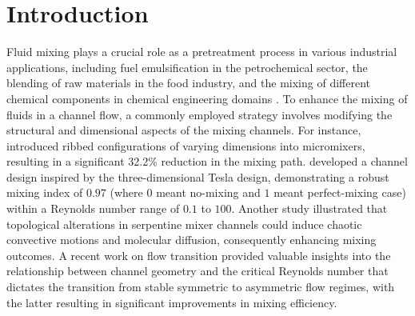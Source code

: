 \documentclass[%
aip,
amsmath,amssymb,
reprint,
]{revtex4-1}
\begin{document}
	\section{Introduction}
	\label{sec:headings}
	Fluid mixing plays a crucial role as a pretreatment process in various industrial applications, including fuel emulsification in the petrochemical sector, the blending of raw materials in the food industry, and the mixing of different chemical components in chemical engineering domains \citep{Peterwitz2021,Wang2021, Nunez-Flores2020, Yeh2015}. To enhance the mixing of fluids in a channel flow, a commonly employed strategy involves modifying the structural and dimensional aspects of the mixing channels. For instance, \cite{Kim2011} introduced ribbed configurations of varying dimensions into micromixers, resulting in a significant 32.2\% reduction in the mixing path. \cite{Yang2015} developed a channel design inspired by the three-dimensional Tesla design, demonstrating a robust mixing index of $0.97$ (where $0$ meant no-mixing and $1$ meant perfect-mixing case) within a Reynolds number range of $0.1$ to $100$. Another study\cite{Chen2016} illustrated that topological alterations in serpentine mixer channels could induce chaotic convective motions and molecular diffusion, consequently enhancing mixing outcomes. A recent work on flow transition\cite{Lobasov2018} provided valuable insights into the relationship between channel geometry and the critical Reynolds number that dictates the transition from stable symmetric to asymmetric flow regimes, with the latter resulting in significant improvements in mixing efficiency.
	
\end{document}
